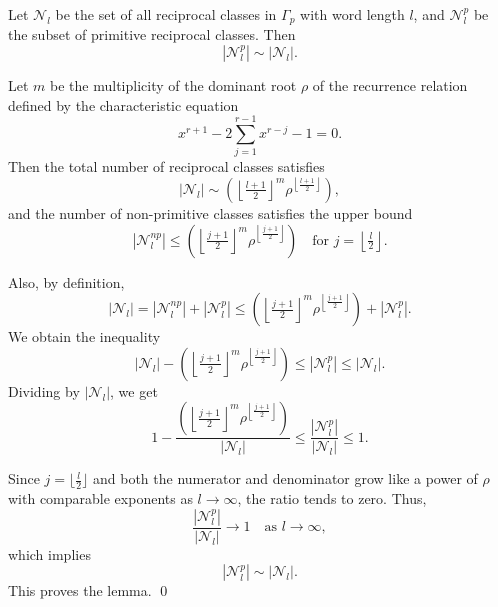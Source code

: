 \documentclass[10pt,a4paper]{amsart}
\renewenvironment{proof}{{\bfseries Proof.}}{\qed}
\begin{document}
	\begin{lemma}\label{prim}
			Let $\mathcal{N}_{l}$ be the set of all reciprocal classes in $\Gamma_p$ with word length $l$, and $\mathcal{N}^{p}_{l}$ be the subset of primitive reciprocal classes. Then \[
		|\mathcal{N}^{p}_{l}| \sim |\mathcal{N}_{l}|.
		\]
		
	\end{lemma}

	\begin{proof}
		Let $m$ be the multiplicity of the dominant root $\rho$ of the recurrence relation defined by the characteristic equation \[x^{r+1} - 2\sum_{j=1}^{r-1} x^{r-j} - 1 = 0.\]Then the total number of reciprocal classes satisfies
		\[
		|\mathcal{N}_{l}| \sim \left(\left\lfloor \tfrac{l+1}{2} \right\rfloor^{m} \rho^{\left\lfloor \tfrac{l+1}{2} \right\rfloor} \right),
		\]
		and the number of non-primitive classes satisfies the upper bound
		\[
		|\mathcal{N}^{np}_{l}| \leq \left(\left\lfloor \tfrac{j+1}{2} \right\rfloor^{m} \rho^{\left\lfloor \tfrac{j+1}{2} \right\rfloor} \right)
		\quad \text{for } j = \left\lfloor \tfrac{l}{2} \right\rfloor.
		\]
	
		Also, by definition,
		\[
		|\mathcal{N}_{l}| = |\mathcal{N}^{np}_{l}| + |\mathcal{N}^{p}_{l}| \leq \left(\left\lfloor \tfrac{j+1}{2} \right\rfloor^{m} \rho^{\left\lfloor \tfrac{j+1}{2} \right\rfloor} \right) + |\mathcal{N}^{p}_{l}|.
		\]
		We obtain the inequality
		\[
		|\mathcal{N}_{l}| - \left(\left\lfloor \tfrac{j+1}{2} \right\rfloor^{m} \rho^{\left\lfloor \tfrac{j+1}{2} \right\rfloor} \right) \leq |\mathcal{N}^{p}_{l}| \leq |\mathcal{N}_{l}|.
		\]
		Dividing by $|\mathcal{N}_{l}|$, we get
		\[
		1 - \frac{\left(\left\lfloor \tfrac{j+1}{2} \right\rfloor^{m} \rho^{\left\lfloor \tfrac{j+1}{2} \right\rfloor} \right)}{|\mathcal{N}_{l}|}
		\leq \frac{|\mathcal{N}^{p}_{l}|}{|\mathcal{N}_{l}|} \leq 1.
		\]
		
		Since \( j = \lfloor \tfrac{l}{2} \rfloor \) and both the numerator and denominator grow like a power of $\rho$ with comparable exponents as \( l \to \infty \), the ratio tends to zero. Thus,
		\[
		\frac{|\mathcal{N}^{p}_{l}|}{|\mathcal{N}_{l}|} \to 1 \quad \text{as } l \to \infty,
		\]
		which implies
		\[
		|\mathcal{N}^{p}_{l}| \sim |\mathcal{N}_{l}|.
		\]
    This proves the lemma. 
	\end{proof}
\end{document}
